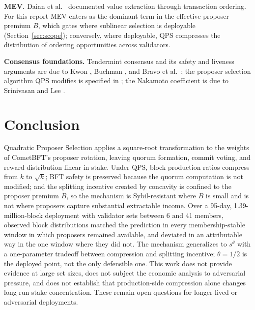 \documentclass[11pt,a4paper]{article}
\begin{document}
\textbf{MEV.} Daian et al.\ \cite{daian} documented value extraction through transaction ordering. For this report MEV enters as the dominant term in the effective proposer premium $B$, which gates where sublinear selection is deployable (Section~\ref{sec:scope}); conversely, where deployable, QPS compresses the distribution of ordering opportunities across validators.

\textbf{Consensus foundations.} Tendermint consensus and its safety and liveness arguments are due to Kwon \cite{kwon}, Buchman \cite{buchman}, and Bravo et al.\ \cite{bravo}; the proposer selection algorithm QPS modifies is specified in \cite{cometbft}; the Nakamoto coefficient is due to Srinivasan and Lee \cite{srinivasan}.

\section{Conclusion}

Quadratic Proposer Selection applies a square-root transformation to the weights of CometBFT's proposer rotation, leaving quorum formation, commit voting, and reward distribution linear in stake. Under QPS, block production ratios compress from $k$ to $\sqrt{k}$; BFT safety is preserved because the quorum computation is not modified; and the splitting incentive created by concavity is confined to the proposer premium $B$, so the mechanism is Sybil-resistant where $B$ is small and is not where proposers capture substantial extractable income. Over a 95-day, 1.39-million-block deployment with validator sets between 6 and 41 members, observed block distributions matched the prediction in every membership-stable window in which proposers remained available, and deviated in an attributable way in the one window where they did not. The mechanism generalizes to $s^\theta$ with a one-parameter tradeoff between compression and splitting incentive; $\theta = 1/2$ is the deployed point, not the only defensible one. This work does not provide evidence at large set sizes, does not subject the economic analysis to adversarial pressure, and does not establish that production-side compression alone changes long-run stake concentration. These remain open questions for longer-lived or adversarial deployments.
\end{document}
